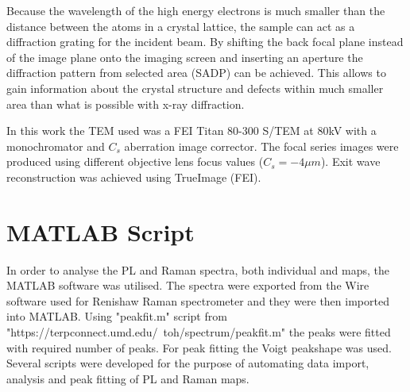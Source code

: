 Because the wavelength of the high energy electrons is much smaller than the distance between the atoms in a crystal lattice, the sample can act as a diffraction grating for the incident beam. By shifting the back focal plane instead of the image plane onto the imaging screen and inserting an aperture the diffraction pattern from selected area (SADP) can be achieved. This allows to gain information about the crystal structure and defects within much smaller area than what is possible with x-ray diffraction.

In this work the TEM used was a FEI Titan 80-300 S/TEM at 80kV with a monochromator and $C_s$ aberration image corrector. The focal series images were produced using different objective lens focus values ($C_s = -4\mu m$). Exit wave reconstruction was achieved using TrueImage (FEI).

\section{MATLAB Script}
\label{sec:MATLAB}
In order to analyse the PL and Raman spectra, both individual and maps, the MATLAB software was utilised. The spectra were exported from the Wire software used for Renishaw Raman spectrometer and they were then imported into MATLAB. Using "peakfit.m" script from "https://terpconnect.umd.edu/~toh/spectrum/peakfit.m" the peaks were fitted with required number of peaks. For peak fitting the Voigt peakshape was used. Several scripts were developed for the purpose of automating data import, analysis and peak fitting of PL and Raman maps.